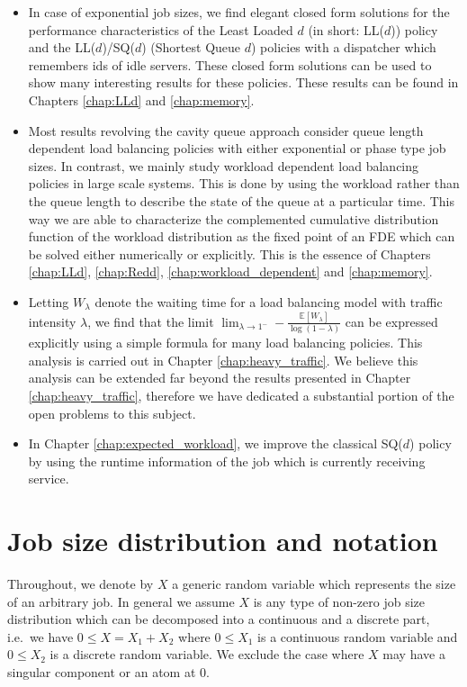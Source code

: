 \documentclass[12pt]{report}
\newcommand{\E}{\mathbb{E}}
\begin{document}
\begin{itemize}
	\item In case of exponential job sizes, we find elegant closed form solutions for the performance characteristics of the Least Loaded $d$ (in short: LL($d$)) policy and the LL($d$)/SQ($d$) (Shortest Queue $d$) policies with a dispatcher which remembers ids of idle servers. These closed form solutions can be used to show many interesting results for these policies. These results can be found in Chapters \ref{chap:LLd} and \ref{chap:memory}.
	\item Most results revolving the cavity queue approach consider queue length dependent load balancing policies with either exponential or phase type job sizes. In contrast, we mainly study workload dependent load balancing policies in large scale systems. This is done by using the workload rather than the queue length to describe the state of the queue at a particular time. This way we are able to characterize the complemented cumulative distribution function of the workload distribution as the fixed point of an FDE which can be solved either numerically or explicitly. This is the essence of Chapters \ref{chap:LLd}, \ref{chap:Redd}, \ref{chap:workload_dependent} and \ref{chap:memory}.
	\item Letting $W_\lambda$ denote the waiting time for a load balancing model with traffic intensity $\lambda$, we find that the limit $\lim_{\lambda \rightarrow 1^-} -\frac{\E[W_\lambda]}{\log(1-\lambda)}$ can be expressed explicitly using a simple formula for many load balancing policies. This analysis is carried out in Chapter \ref{chap:heavy_traffic}. We believe this analysis can be extended far beyond the results presented in Chapter \ref{chap:heavy_traffic}, therefore we have dedicated a substantial portion of the open problems to this subject.
	\item In Chapter \ref{chap:expected_workload}, we improve the classical SQ($d$) policy by using the runtime information of the job which is currently receiving service.
\end{itemize}

\section{Job size distribution and notation} \label{sec:jobSizeDist}
Throughout, we denote by $X$ a generic random variable which represents the size of an arbitrary job. In general we assume $X$ is any type of non-zero job size distribution which can be decomposed into a continuous and a discrete part, i.e.~we have $0\leq X=X_1+X_2$ where $0\leq X_1$ is a continuous random variable and $0 \leq X_2$ is a discrete random variable. We exclude the case where $X$ may have a singular component or an atom at $0$.
\end{document}
